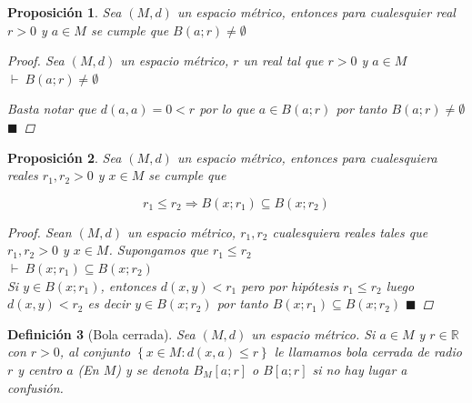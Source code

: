\documentclass[oneside]{book} %
\theoremstyle{Teorema}
\newtheorem{Definicion}{Definición}[chapter]
\newtheorem{Proposicion}[Definicion]{Proposición}
\theoremstyle{Ejemplos}
\theoremstyle{[Obs]}
\renewcommand{\{}{\left\lbrace} %
\renewcommand{\}}{\right\rbrace} %
\renewcommand{\sc}{\subseteq} %
\newcommand{\R}{\mathbb{R}} %
\renewcommand{\qed}{$\blacksquare$} %
\newcommand{\pd}{$\vdash\ $} %
\begin{document}
			\begin{Proposicion}\setlength{\parindent}{0em}
				
				Sea $(M, d)$ un espacio métrico, entonces para cualesquier real $r > 0$ y $a \in M$ se cumple que $B(a;r) \neq \emptyset$ 

				\begin{proof}
					
					Sea $(M, d)$ un espacio métrico, $r$ un real tal que $r > 0$ y $a \in M$ \\ 
					\pd $B(a;r) \neq \emptyset$ 

					Basta notar que $d(a, a) = 0 < r$ por lo que $a \in B(a;r)$ por tanto $B(a;r) \neq \emptyset$ \qed

				\end{proof}

			\end{Proposicion}

			\begin{Proposicion}\setlength{\parindent}{0em}
				
				Sea $(M, d)$ un espacio métrico, entonces para cualesquiera reales $r_1, r_2 > 0$ y $x \in M$ se cumple que 
				
				\[ r_1 \leq r_2 \Rightarrow B(x;r_1) \sc B(x;r_2) \] 

				\begin{proof}
					
					Sean $(M, d)$ un espacio métrico, $r_1, r_2$ cualesquiera reales tales que $r_1, r_2 > 0$ y $x \in M$. Supongamos que $r_1 \leq r_2$ \\
					\pd $B(x;r_1) \sc B(x;r_2)$ \\

					Si $y \in B(x;r_1)$, entonces $d(x, y) < r_1$ pero por hipótesis $r_1 \leq r_2$ luego $d(x, y) < r_2$ es decir $y \in B(x;r_2)$ por tanto $B(x;r_1) \sc B(x;r_2)$ \qed

				\end{proof}

			\end{Proposicion}

			\begin{Definicion}[Bola cerrada]\setlength{\parindent}{0em}
					
				Sea $(M, d)$ un espacio métrico. Si $a \in M$ y $r \in \R$ con $r > 0$, al conjunto $\{ x \in M : d(x, a) \leq r \}$ le llamamos bola cerrada de radio $r$ y centro $a$ (En $M$) y se denota $B_M[a;r]$ o $B[a;r]$ si no hay lugar a confusión. 

			\end{Definicion}
\end{document}
